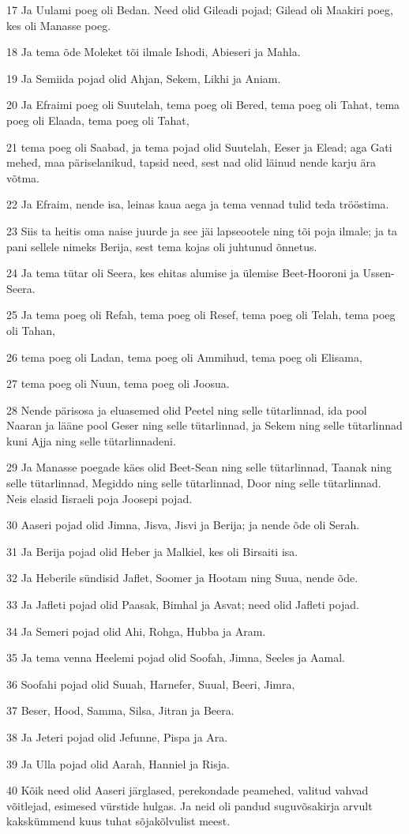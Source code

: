 \par 17 Ja Uulami poeg oli Bedan. Need olid Gileadi pojad; Gilead oli Maakiri poeg, kes oli Manasse poeg.
\par 18 Ja tema õde Moleket tõi ilmale Ishodi, Abieseri ja Mahla.
\par 19 Ja Semiida pojad olid Ahjan, Sekem, Likhi ja Aniam.
\par 20 Ja Efraimi poeg oli Suutelah, tema poeg oli Bered, tema poeg oli Tahat, tema poeg oli Elaada, tema poeg oli Tahat,
\par 21 tema poeg oli Saabad, ja tema pojad olid Suutelah, Eeser ja Elead; aga Gati mehed, maa päriselanikud, tapsid need, sest nad olid läinud nende karju ära võtma.
\par 22 Ja Efraim, nende isa, leinas kaua aega ja tema vennad tulid teda trööstima.
\par 23 Siis ta heitis oma naise juurde ja see jäi lapseootele ning tõi poja ilmale; ja ta pani sellele nimeks Berija, sest tema kojas oli juhtunud õnnetus.
\par 24 Ja tema tütar oli Seera, kes ehitas alumise ja ülemise Beet-Hooroni ja Ussen-Seera.
\par 25 Ja tema poeg oli Refah, tema poeg oli Resef, tema poeg oli Telah, tema poeg oli Tahan,
\par 26 tema poeg oli Ladan, tema poeg oli Ammihud, tema poeg oli Elisama,
\par 27 tema poeg oli Nuun, tema poeg oli Joosua.
\par 28 Nende pärisosa ja eluasemed olid Peetel ning selle tütarlinnad, ida pool Naaran ja lääne pool Geser ning selle tütarlinnad, ja Sekem ning selle tütarlinnad kuni Ajja ning selle tütarlinnadeni.
\par 29 Ja Manasse poegade käes olid Beet-Sean ning selle tütarlinnad, Taanak ning selle tütarlinnad, Megiddo ning selle tütarlinnad, Door ning selle tütarlinnad. Neis elasid Iisraeli poja Joosepi pojad.
\par 30 Aaseri pojad olid Jimna, Jisva, Jisvi ja Berija; ja nende õde oli Serah.
\par 31 Ja Berija pojad olid Heber ja Malkiel, kes oli Birsaiti isa.
\par 32 Ja Heberile sündisid Jaflet, Soomer ja Hootam ning Suua, nende õde.
\par 33 Ja Jafleti pojad olid Paasak, Bimhal ja Asvat; need olid Jafleti pojad.
\par 34 Ja Semeri pojad olid Ahi, Rohga, Hubba ja Aram.
\par 35 Ja tema venna Heelemi pojad olid Soofah, Jimna, Seeles ja Aamal.
\par 36 Soofahi pojad olid Suuah, Harnefer, Suual, Beeri, Jimra,
\par 37 Beser, Hood, Samma, Silsa, Jitran ja Beera.
\par 38 Ja Jeteri pojad olid Jefunne, Pispa ja Ara.
\par 39 Ja Ulla pojad olid Aarah, Hanniel ja Risja.
\par 40 Kõik need olid Aaseri järglased, perekondade peamehed, valitud vahvad võitlejad, esimesed vürstide hulgas. Ja neid oli pandud suguvõsakirja arvult kakskümmend kuus tuhat sõjakõlvulist meest.

